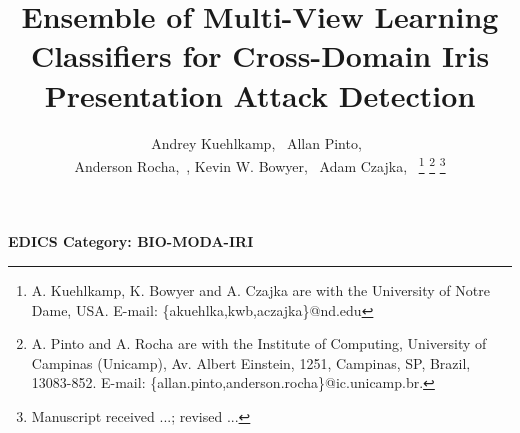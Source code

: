 \documentclass[journal,twocolumn]{IEEEtran}
\begin{document}
\title{Ensemble of Multi-View Learning Classifiers for Cross-Domain Iris Presentation Attack Detection\\
}


\author{Andrey Kuehlkamp,~
        Allan Pinto,~\\
        Anderson Rocha,~,
        Kevin W. Bowyer,~
        Adam Czajka,~%
\thanks{A. Kuehlkamp, K. Bowyer and A. Czajka  are with the University of Notre Dame, USA. E-mail: \{akuehlka,kwb,aczajka\}@nd.edu}%
\thanks{A. Pinto and A. Rocha are with the Institute of Computing, University of Campinas (Unicamp), Av. Albert Einstein, 1251, Campinas, SP, Brazil, 13083-852. E-mail: \{allan.pinto,anderson.rocha\}@ic.unicamp.br.}%
\thanks{Manuscript received ...; revised ...}}

\maketitle


\begin{abstract}

\end{abstract}



\ifCLASSOPTIONpeerreview
\begin{center} \bfseries EDICS Category: BIO-MODA-IRI\end{center}
\fi

\IEEEpeerreviewmaketitle


\end{document}
